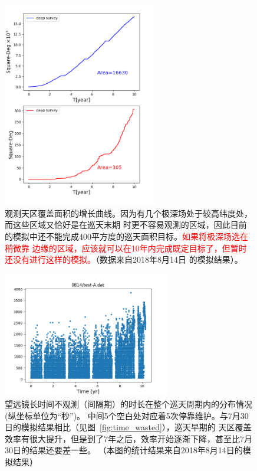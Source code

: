 \documentclass[a4paper,11pt]{ctexart}
\newcommand{\RT}[1]{\textcolor{red}{#1}}
\begin{document}
\begin{figure}[h!]
\centering
\includegraphics[width=0.6\textwidth]{figures/area_E20_b17_0814.png}
\caption{观测天区覆盖面积的增长曲线。因为有几个极深场处于较高纬度处，而这些区域又恰好是在巡天末期
时更不容易观测的区域，因此目前的模拟中还不能完成400平方度的巡天面积目标。\RT{如果将极深场选在稍微靠
边缘的区域，应该就可以在10年内完成既定目标了，但暂时还没有进行这样的模拟。}（数据来自2018年8月14日
的模拟结果）。}
\label{fig:area_growth_0804}
\end{figure}

\begin{figure}[h!]
\centering
\includegraphics[width=0.65\textwidth]{figures/0814_test-A.png}
\caption{望远镜长时间不观测（间隔期）的时长在整个巡天周期内的分布情况(纵坐标单位为“秒”)。
中间5个空白处对应着5次停靠维护。与7月30日的模拟结果相比（见图~\ref{fig:time_wasted}），巡天早期的
天区覆盖效率有很大提升，但是到了7年之后，效率开始逐渐下降，甚至比7月30日的结果还要差一些。
（本图的统计结果来自2018年8月14日的模拟结果）}
\label{fig:time_wasted_0814}
\end{figure}
\end{document}
